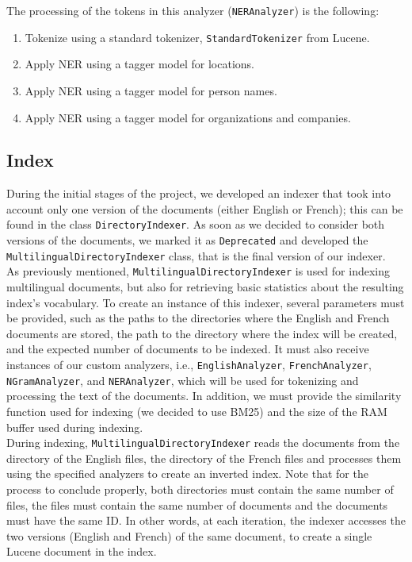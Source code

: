The processing of the tokens in this analyzer (\texttt{NERAnalyzer}) is the following:
\begin{enumerate}
    \item Tokenize using a standard tokenizer, \texttt{StandardTokenizer} from Lucene.
    \item Apply NER using a tagger model for locations.
    \item Apply NER using a tagger model for person names.
    \item Apply NER using a tagger model for organizations and companies.
\end{enumerate}

\subsection{Index}\label{subsec:index}

During the initial stages of the project, we developed an indexer that took into account only one version of the
documents (either English or French);
this can be found in the class \texttt{DirectoryIndexer}.
As soon as we decided to consider both versions of the documents, we marked it as \texttt{Deprecated} and developed
the \texttt{MultilingualDirectoryIndexer} class, that is the final version of our indexer.\\

As previously mentioned, \texttt{MultilingualDirectoryIndexer} is used for indexing multilingual documents, but also for
retrieving basic statistics about the resulting index's vocabulary.
To create an instance of this indexer, several parameters must be provided, such as the paths to the directories where
the English and French documents are stored, the path to the directory where the index will be created, and the expected
number of documents to be indexed.
It must also receive instances of our custom analyzers, i.e., \texttt{EnglishAnalyzer}, \texttt{FrenchAnalyzer},
\texttt{NGramAnalyzer}, and \texttt{NERAnalyzer}, which will be used for tokenizing and processing the text of the
documents.
In addition, we must provide the similarity function used for indexing (we decided to use BM25) and the size of the RAM
buffer used during indexing.\\

During indexing, \texttt{MultilingualDirectoryIndexer} reads the documents from the directory of the English files, the
directory of the French files and processes them using the specified analyzers to create an inverted index.
Note that for the process to conclude properly, both directories must contain the same number of files, the files must
contain the same number of documents and the documents must have the same ID\@.
In other words, at each iteration, the indexer accesses the two versions (English and French) of the same document, to
create a single Lucene document in the index.\\

